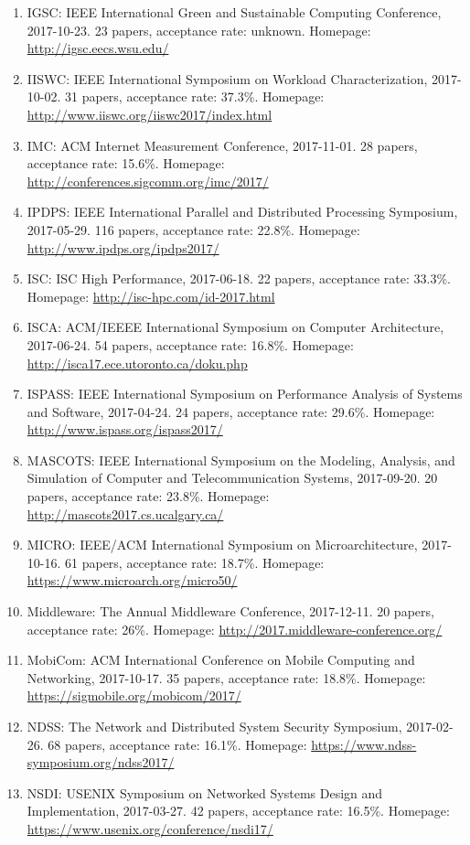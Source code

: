 \documentclass{article}
\begin{document}
\begin{enumerate}
\item IGSC: IEEE International Green and Sustainable Computing Conference, 2017-10-23. 23 papers, acceptance rate: unknown. Homepage: \url{http://igsc.eecs.wsu.edu/}
\item IISWC: IEEE International Symposium on Workload Characterization, 2017-10-02. 31 papers, acceptance rate: 37.3\%. Homepage: \url{http://www.iiswc.org/iiswc2017/index.html}
\item IMC: ACM Internet Measurement Conference, 2017-11-01. 28 papers, acceptance rate: 15.6\%. Homepage: \url{http://conferences.sigcomm.org/imc/2017/}
\item IPDPS: IEEE International Parallel and Distributed Processing Symposium, 2017-05-29. 116 papers, acceptance rate: 22.8\%. Homepage: \url{http://www.ipdps.org/ipdps2017/}
\item ISC: ISC High Performance, 2017-06-18. 22 papers, acceptance rate: 33.3\%. Homepage: \url{http://isc-hpc.com/id-2017.html}
\item ISCA: ACM/IEEEE International Symposium on Computer Architecture, 2017-06-24. 54 papers, acceptance rate: 16.8\%. Homepage: \url{http://isca17.ece.utoronto.ca/doku.php}
\item ISPASS: IEEE International Symposium on Performance Analysis of Systems and Software, 2017-04-24. 24 papers, acceptance rate: 29.6\%. Homepage: \url{http://www.ispass.org/ispass2017/}
\item MASCOTS: IEEE International Symposium on the Modeling, Analysis, and Simulation of Computer and Telecommunication Systems, 2017-09-20. 20 papers, acceptance rate: 23.8\%. Homepage: \url{http://mascots2017.cs.ucalgary.ca/}
\item MICRO: IEEE/ACM International Symposium on Microarchitecture, 2017-10-16. 61 papers, acceptance rate: 18.7\%. Homepage: \url{https://www.microarch.org/micro50/}
\item Middleware: The Annual Middleware Conference, 2017-12-11. 20 papers, acceptance rate: 26\%. Homepage: \url{http://2017.middleware-conference.org/}
\item MobiCom: ACM International Conference on Mobile Computing and Networking, 2017-10-17. 35 papers, acceptance rate: 18.8\%. Homepage: \url{https://sigmobile.org/mobicom/2017/}
\item NDSS: The Network and Distributed System Security Symposium, 2017-02-26. 68 papers, acceptance rate: 16.1\%. Homepage: \url{https://www.ndss-symposium.org/ndss2017/}
\item NSDI: USENIX Symposium on Networked Systems Design and Implementation, 2017-03-27. 42 papers, acceptance rate: 16.5\%. Homepage: \url{https://www.usenix.org/conference/nsdi17/}

\end{enumerate}
\end{document}
